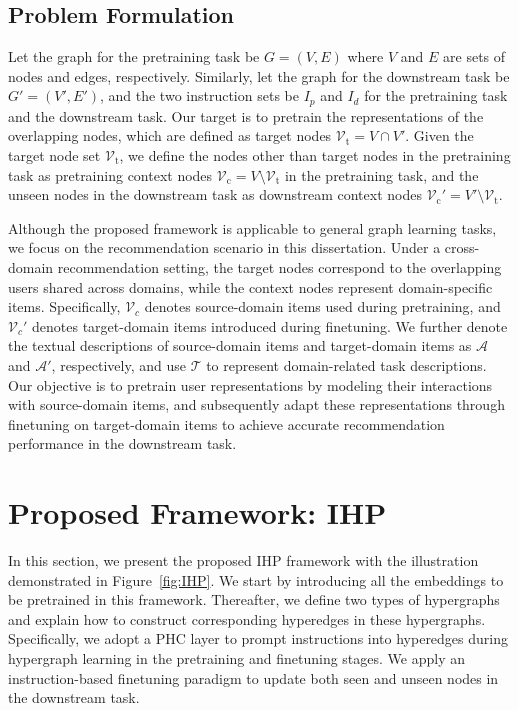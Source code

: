 \subsection{Problem Formulation}
Let the graph for the pretraining task be $G=(V, E)$ where $V$ and $E$ are sets of nodes and edges, respectively. 
Similarly, let the graph for the downstream task be $G'=(V', E')$, and the two instruction sets be $I_p$ and $I_d$ for the pretraining task and the downstream task. Our target is to pretrain the representations of the overlapping nodes, which are defined as target nodes $\mathcal{V}_\text{t}=V\cap V'$. 
Given the target node set $\mathcal{V}_\text{t}$, we define the nodes other than target nodes in the pretraining task as pretraining context nodes $\mathcal{V}_\text{c}=V\setminus \mathcal{V}_\text{t}$ in the pretraining task, and the unseen nodes in the downstream task as downstream context nodes $\mathcal{V}_\text{c}'=V'\setminus \mathcal{V}_\text{t}$.

Although the proposed framework is applicable to general graph learning tasks, we focus on the recommendation scenario in this dissertation. Under a cross-domain recommendation setting, the target nodes correspond to the overlapping users shared across domains, while the context nodes represent domain-specific items. Specifically, $\mathcal{V}_c$ denotes source-domain items used during pretraining, and $\mathcal{V}_c'$ denotes target-domain items introduced during finetuning. We further denote the textual descriptions of source-domain items and target-domain items as $\mathcal{A}$ and $\mathcal{A}'$, respectively, and use $\mathcal{T}$ to represent domain-related task descriptions. Our objective is to pretrain user representations by modeling their interactions with source-domain items, and subsequently adapt these representations through finetuning on target-domain items to achieve accurate recommendation performance in the downstream task.

\section{Proposed Framework: IHP}
In this section, we present the proposed IHP framework with the illustration demonstrated in Figure~\ref{fig:IHP}. 
We start by introducing all the embeddings to be pretrained in this framework. 
Thereafter, we define two types of hypergraphs and explain how to construct corresponding hyperedges in these hypergraphs. 
Specifically, we adopt a PHC layer to prompt instructions into hyperedges during hypergraph learning in the pretraining and finetuning stages. 
We apply an instruction-based finetuning paradigm to update both seen and unseen
nodes in the downstream task.

